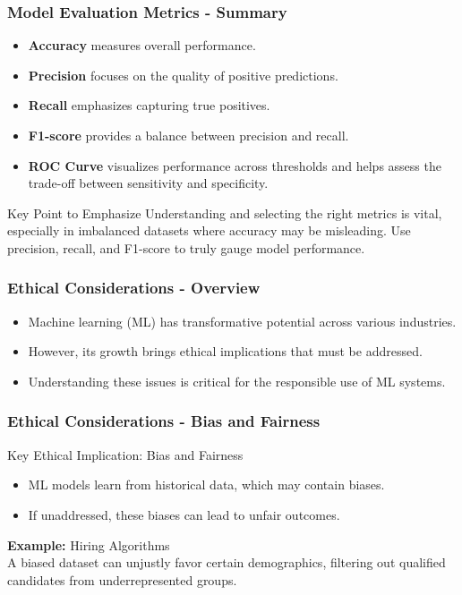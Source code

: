 \documentclass[aspectratio=169]{beamer}
\begin{document}
\begin{frame}[fragile]
    \frametitle{Model Evaluation Metrics - Summary}
    \begin{itemize}
        \item \textbf{Accuracy} measures overall performance.
        \item \textbf{Precision} focuses on the quality of positive predictions.
        \item \textbf{Recall} emphasizes capturing true positives.
        \item \textbf{F1-score} provides a balance between precision and recall.
        \item \textbf{ROC Curve} visualizes performance across thresholds and helps assess the trade-off between sensitivity and specificity.
    \end{itemize}
    
    \begin{block}{Key Point to Emphasize}
        Understanding and selecting the right metrics is vital, especially in imbalanced datasets where accuracy may be misleading. Use precision, recall, and F1-score to truly gauge model performance.
    \end{block}
\end{frame}

\begin{frame}[fragile]
    \frametitle{Ethical Considerations - Overview}
    \begin{itemize}
        \item Machine learning (ML) has transformative potential across various industries.
        \item However, its growth brings ethical implications that must be addressed.
        \item Understanding these issues is critical for the responsible use of ML systems.
    \end{itemize}
\end{frame}

\begin{frame}[fragile]
    \frametitle{Ethical Considerations - Bias and Fairness}
    \begin{block}{Key Ethical Implication: Bias and Fairness}
        \begin{itemize}
            \item ML models learn from historical data, which may contain biases.
            \item If unaddressed, these biases can lead to unfair outcomes.
        \end{itemize}
    \end{block}
    \begin{example}
        \textbf{Example:} Hiring Algorithms\\
        A biased dataset can unjustly favor certain demographics, filtering out qualified candidates from underrepresented groups.
    \end{example}
\end{frame}
\end{document}
